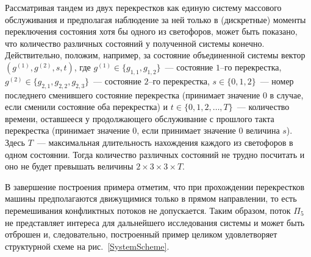 \documentclass[a4paper,12pt,russian]{extarticle}
\begin{document}
Рассматривая тандем из двух перекрестков как единую систему массового обслуживания и предполагая наблюдение за ней только в (дискретные) моменты переключения состояния хотя бы одного из светофоров, может быть показано, что количество различных состояний у полученной системы конечно. Действительно, положим, например, за состояние объединенной системы вектор $(g^{(1)},g^{(2)}, s, t)$, где $g^{(1)}\in \{g_{1,1},g_{1,2}\}$~--- состояние $1$--го перекрестка, $g^{(2)}\in \{g_{2,1},g_{2,2},g_{2,3}\}$~--- состояние $2$--го перекрестка, $s \in \{0, 1, 2\}$~--- номер последнего сменившего состояние перекрестка (принимает значение $0$ в случае, если сменили состояние оба перекрестка) и $t \in \{0, 1, 2, \ldots, T\}$~--- количество времени, оставшееся у продолжающего обслуживание с прошлого такта перекрестка (принимает значение $0$, если принимает значение $0$ величина $s$). Здесь $T$~--- максимальная длительность нахождения каждого из светофоров в одном состоянии. Тогда количество различных состояний не трудно посчитать и оно не будет превышать величины  $2\times 3 \times 3 \times T$.

В завершение построения примера отметим, что при прохождении перекрестков машины предполагаются движущимися только в прямом направлении, то есть перемешивания конфликтных потоков не допускается. Таким образом, поток $\Pi_5$ не представляет интереса для дальнейшего исследования системы и может быть отброшен и, следовательно, построенный пример целиком удовлетворяет структурной схеме на рис.~\ref{SystemScheme}.
\end{document}
